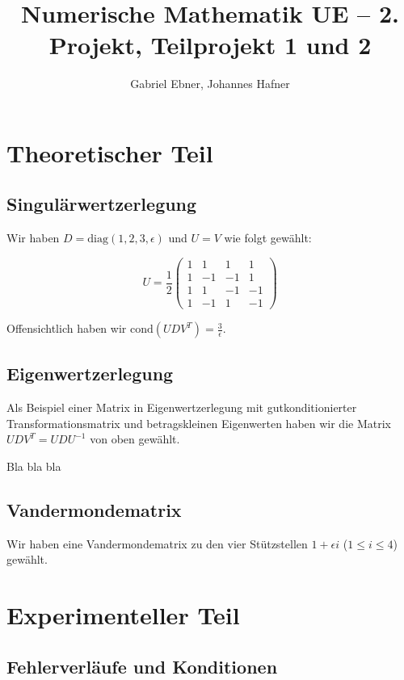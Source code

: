 \documentclass{scrartcl}
\begin{document}
\title{Numerische Mathematik UE -- 2. Projekt, Teilprojekt 1 und 2}
\author{Gabriel Ebner, Johannes Hafner}
\maketitle

\section{Theoretischer Teil}

\subsection{Singulärwertzerlegung}

Wir haben \(D = \mathrm{diag}(1,2,3,\epsilon)\) und \(U=V\) wie folgt gewählt:

\[ U = \frac 1 2 \left( \begin{array}{rrrr}
 1 &  1 &  1 &  1 \\
 1 & -1 & -1 &  1 \\
 1 &  1 & -1 & -1 \\
 1 & -1 &  1 & -1
\end{array} \right) \]

Offensichtlich haben wir \(\mathrm{cond}(UDV^T) = \frac 3 \epsilon\).

\subsection{Eigenwertzerlegung}

Als Beispiel einer Matrix in Eigenwertzerlegung mit gutkonditionierter
Transformationsmatrix und betragskleinen Eigenwerten haben wir die Matrix
\(UDV^T = UDU^{-1}\) von oben gewählt.

Bla bla bla

\subsection{Vandermondematrix}

Wir haben eine Vandermondematrix zu den vier Stützstellen \(1 + \epsilon i\)
(\(1 \leq i \leq 4\)) gewählt.

\section{Experimenteller Teil}

\subsection{Fehlerverläufe und Konditionen}
\end{document}
